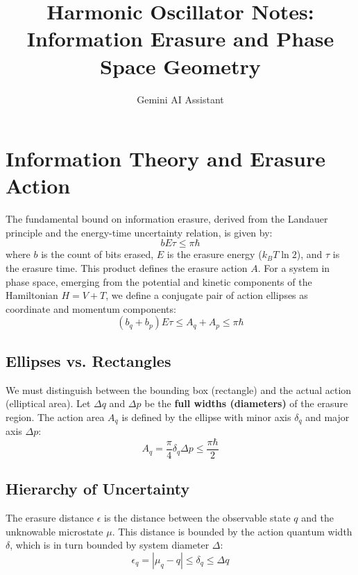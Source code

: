 \documentclass{article}
\title{Harmonic Oscillator Notes: Information Erasure and Phase Space Geometry}
\author{Gemini AI Assistant}
\begin{document}
\maketitle

\section{Information Theory and Erasure Action}

The fundamental bound on information erasure, derived from the Landauer principle and the energy-time uncertainty relation, is given by:
\begin{equation}
    b E \tau \le \pi \hbar
\end{equation}
where $b$ is the count of bits erased, $E$ is the erasure energy ($k_B T \ln 2$), and $\tau$ is the erasure time. This product defines the erasure action $A$. For a system in phase space, emerging from the potential and kinetic components of the Hamiltonian $H=V+T$, we define a conjugate pair of action ellipses as coordinate and momentum components:
\begin{equation}
    (b_q + b_p) E \tau \le A_q + A_p \le \pi \hbar
\end{equation}

\subsection{Ellipses vs. Rectangles}
We must distinguish between the bounding box (rectangle) and the actual action (elliptical area). Let $\Delta q$ and $\Delta p$ be the \textbf{full widths (diameters)} of the erasure region. The action area $A_q$ is defined by the ellipse with minor axis $\delta_q$ and major axis $\Delta p$:
\begin{equation}
    A_q = \frac{\pi}{4} \delta_q \Delta p \le \frac{\pi \hbar}{2}
\end{equation}

\subsection{Hierarchy of Uncertainty}
The erasure distance $\epsilon$ is the distance between the observable state $q$ and the unknowable microstate $\mu$. This distance is bounded by the action quantum width $\delta$, which is in turn bounded by system diameter $\Delta$:
\begin{equation}
    \epsilon_q = |\mu_q - q| \le \delta_q \le \Delta q
\end{equation}
\end{document}
